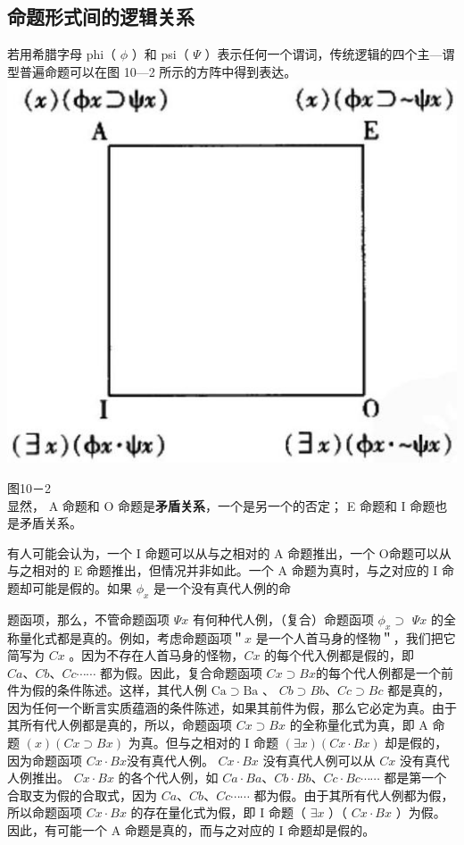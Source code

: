\subsection{命题形式间的逻辑关系}

若用希腊字母 phi（ $\phi$ ）和 psi（ $\Psi$ ）表示任何一个谓词，传统逻辑的四个主—谓型普遍命题可以在图 10—2 所示的方阵中得到表达。\\
\includegraphics[width=\textwidth]{images/2025_05_15_6a28331d5e7c993ad07ag-466.jpg}

图10－2\\
显然， A 命题和 O 命题是\textbf{矛盾关系}，一个是另一个的否定； E 命题和 I 命题也是矛盾关系。

有人可能会认为，一个 I 命题可以从与之相对的 A 命题推出，一个 O命题可以从与之相对的 E 命题推出，但情况并非如此。一个 A 命题为真时，与之对应的 I 命题却可能是假的。如果 $\phi_{x}$ 是一个没有真代人例的命

题函项，那么，不管命题函项 $\Psi x$ 有何种代人例，（复合）命题函项 $\phi_{x} \supset$ $\Psi x$ 的全称量化式都是真的。例如，考虑命题函项＂$x$ 是一个人首马身的怪物＂，我们把它简写为 $C x$ 。因为不存在人首马身的怪物，$C x$ 的每个代入例都是假的，即 $C a 、 C b 、 C c \cdots \cdots$ 都为假。因此，复合命题函项 $C x \supset B x$的每个代人例都是一个前件为假的条件陈述。这样，其代人例 $\mathrm{Ca} \supset \mathrm{Ba}$ 、 $C b \supset B b 、 C c \supset B c$ 都是真的，因为任何一个断言实质蕴涵的条件陈述，如果其前件为假，那么它必定为真。由于其所有代人例都是真的，所以，命题函项 $C x \supset B x$ 的全称量化式为真，即 A 命题 $(x)(C x \supset B x)$ 为真。但与之相对的 I 命题 $(\exists x)(C x \cdot B x)$ 却是假的，因为命题函项 $C x \cdot B x$没有真代人例。 $C x \cdot B x$ 没有真代人例可以从 $C x$ 没有真代人例推出。 $C x \cdot B x$ 的各个代人例，如 $C a \cdot B a 、 C b \cdot B b 、 C c \cdot B c \cdots \cdots$ 都是第一个合取支为假的合取式，因为 $C a 、 C b 、 C c \cdots \cdots$ 都为假。由于其所有代人例都为假，所以命题函项 $C x \cdot B x$ 的存在量化式为假，即 I 命题（ $\exists x$ ）（ $C x \cdot B x$ ）为假。因此，有可能一个 A 命题是真的，而与之对应的 I 命题却是假的。

